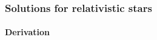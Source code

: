 \begin{frame}
\frametitle{Solutions for relativistic stars}
\framesubtitle{Derivation}



\end{frame}
